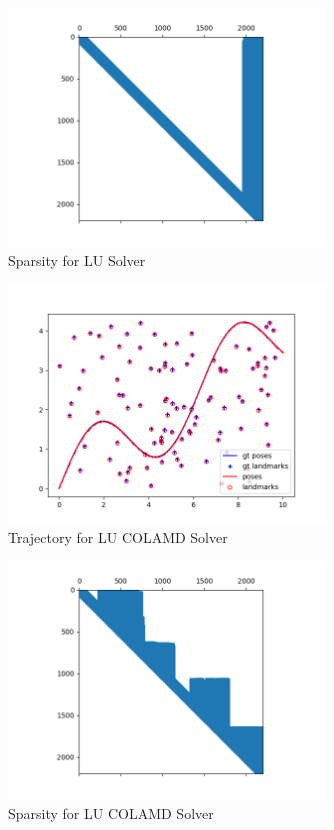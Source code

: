 \documentclass[12pt, a4paper]{article}
\begin{document}
\begin{figure}
    \center
    \includegraphics[width=0.75\textwidth]{linear_results/LU_Factor_Sparsity.png}
    \caption{Sparsity for LU Solver}
\end{figure}

\begin{figure}
    \center
    \includegraphics[width=0.75\textwidth]{linear_results/LU_COLAMD_Traj.png}
    \caption{Trajectory for LU COLAMD Solver}
\end{figure}

\begin{figure}
    \center
    \includegraphics[width=0.75\textwidth]{linear_results/LU_COLAMD_Sparsity.png}
    \caption{Sparsity for LU COLAMD Solver}
\end{figure}
\end{document}
